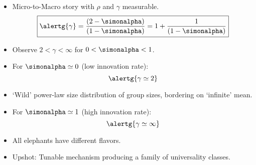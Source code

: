 
\begin{frame}

  \begin{block}{}
  \begin{itemize}
  \item<+-> 
    Micro-to-Macro story with $\rho$ and $\gamma$ measurable.
    $$
    \boxed{
      \alertg{\gamma} = \frac{(2-\simonalpha)}{(1-\simonalpha)} = 1 + \frac{1}{(1-\simonalpha)}
    }
    $$
  \item<+-> 
    Observe $2 < \gamma < \infty $ for  $0 < \simonalpha < 1$.
  \item<+-> 
    For $\simonalpha \simeq 0$ (low innovation rate):\\
    $$\alertg{\gamma \simeq 2}$$
  \item<+-> 
    `Wild' power-law size distribution of group sizes, 
    bordering on `infinite' mean.
  \item<+-> 
    For $\simonalpha \simeq 1$ (high innovation rate):\\
    $$\alertg{\gamma \simeq \infty}$$
  \item<+-> 
    All elephants have different flavors.
  \item<+-> 
    Upshot: Tunable mechanism producing 
    a family of universality classes.
  \end{itemize}
  \end{block}

\end{frame}

